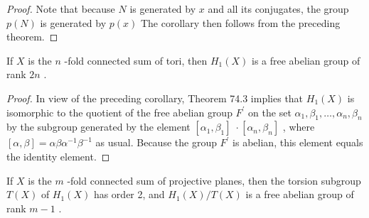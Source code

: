 \begin{proof}Note that because \(N\) is generated by \(x\) and all its conjugates, the group \(p\left( N\right)\) is generated by \(p\left( x\right)\) The corollary then follows from the preceding theorem.\end{proof}
\begin{theorem} If \(X\) is the \(n\) -fold connected sum of tori, then \({H}_{1}\left( X\right)\) is a free abelian group of rank \({2n}\) .
\end{theorem}

\begin{proof}In view of the preceding corollary, Theorem 74.3 implies that \({H}_{1}\left( X\right)\) is isomorphic to the quotient of the free abelian group \({F}^{\prime }\) on the set \({\alpha }_{1},{\beta }_{1},\ldots ,{\alpha }_{n},{\beta }_{n}\) by the subgroup generated by the element \(\left\lbrack  {{\alpha }_{1},{\beta }_{1}}\right\rbrack  \; \cdot  \left\lbrack  {{\alpha }_{n},{\beta }_{n}}\right\rbrack\) , where \(\left\lbrack  {\alpha ,\beta }\right\rbrack = {\alpha \beta }{\alpha }^{-1}{\beta }^{-1}\) as usual. Because the group \({F}^{\prime }\) is abelian, this element equals the identity element.\end{proof}
\begin{theorem} If \(X\) is the \(m\) -fold connected sum of projective planes, then the torsion subgroup \(T\left( X\right)\) of \({H}_{1}\left( X\right)\) has order 2, and \({H}_{1}\left( X\right) /T\left( X\right)\) is a free abelian group of rank \(m - 1\) .
\end{theorem}

